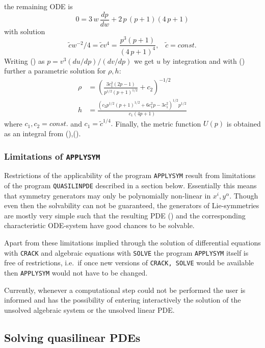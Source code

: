 the remaining ODE is
\[0 = 3\,w\,\frac{dp}{dw} + 2\,p\,(p+1)(4\,p+1)   \]
with solution
\[ \tilde{c}w^{-2}/4 = \tilde{c}v^4 = \frac{p^3(p+1)}{(4\,p+1)^4},\;\;\;
 \tilde{c}=const. \]
Writing () as $p = v^3(du/dp)/(dv/dp)$ we get $u$ by integration
and with () further a parametric solution for $\rho,h$:
\begin{align}
\rho & = \left(\frac{3c_1^2(2p-1)}{p^{1/2}(p+1)^{1/2}}+c_2\right)^{-1/2} \\
h & = \frac{(c_2p^{1/2}(p+1)^{1/2}+6c_1^2p-3c_1^2)^{1/2}p^{1/2}}{c_1(4p+1)}
\end{align}
where $c_1, c_2 = const.$ and $c_1=\tilde{c}^{1/4}.$ Finally, the metric
function $U(p)$ is obtained as an integral from (),().
\subsubsection{Limitations of \texttt{APPLYSYM}}
Restrictions of the applicability of the program \texttt{APPLYSYM} result
from limitations of the program \texttt{QUASILINPDE} described in a section below.
Essentially this means that symmetry generators may only be polynomially
non-linear in $x^i, y^\alpha$.
Though even then the solvability can not be guaranteed, the
generators of Lie-symmetries are mostly very simple such that the
resulting PDE () and the corresponding characteristic
ODE-system have good chances to be solvable.

Apart from these limitations implied through the solution of differential
equations with \texttt{CRACK} and algebraic equations with \texttt{SOLVE}
the program \texttt{APPLYSYM} itself is free of restrictions,
i.e.\ if once new versions of \texttt{CRACK, SOLVE}
would be available then \texttt{APPLYSYM} would not have to be changed.

Currently, whenever a computational step could not be performed
the user is informed and has the possibility of entering interactively
the solution of the unsolved algebraic system or the unsolved linear PDE.
\subsection{Solving quasilinear PDEs}
